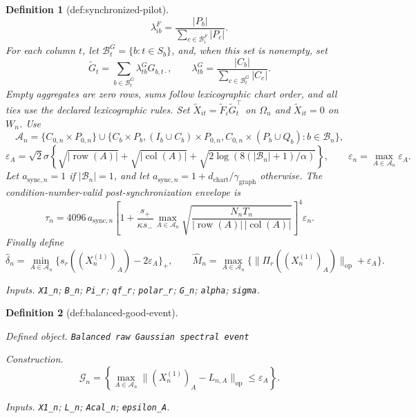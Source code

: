 \documentclass{article}
\newtheorem{definition}{Definition}
\begin{document}
\begin{definition}[def:synchronized-pilot]
\[\qquad
\lambda_{ib}^F=\frac{|P_b|}{\sum_{c\in\mathcal B_i^F}|P_c|}.
\]
For each column \(t\), let \(\mathcal B_t^G=\{b:t\in S_b\}\), and, when this set is nonempty, set
\[
\widetilde G_t=\sum_{b\in\mathcal B_t^G}\lambda_{tb}^GG_{b,t\cdot},
\qquad
\lambda_{tb}^G=\frac{|C_b|}{\sum_{c\in\mathcal B_t^G}|C_c|}.
\]
Empty aggregates are zero rows, sums follow lexicographic chart order, and all ties use the declared lexicographic rules. Set
\(\widetilde X_{it}=\widetilde F_i\widetilde G_t^{\top}\) on \(\Omega_n\) and
\(\widetilde X_{it}=0\) on \(W_n\).
Use
\[
\mathcal A_n=\{C_{0,n}\times P_{0,n}\}\cup
\{C_b\times P_b,(I_b\cup C_b)\times P_{0,n},
C_{0,n}\times(P_b\cup Q_b):b\in\mathcal B_n\},
\]
\[
\varepsilon_A=\sqrt{2}\sigma\left\{\sqrt{|\operatorname{row}(A)|}
+\sqrt{|\operatorname{col}(A)|}
+\sqrt{2\log(8(|\mathcal B_n|+1)/\alpha)}\right\},
\qquad
\varepsilon_n=\max_{A\in\mathcal A_n}\varepsilon_A.
\]
Let \(a_{\mathrm{sync},n}=1\) if \(|\mathcal B_n|=1\), and let
\(a_{\mathrm{sync},n}=1+d_{\mathrm{chart}}/\gamma_{\mathrm{graph}}\) otherwise. The condition-number-valid post-synchronization envelope is
\[
\tau_n=
4096\,a_{\mathrm{sync},n}
\left[
1+\frac{s_+}{\kappa s_-}
\max_{A\in\mathcal A_n}
\sqrt{\frac{N_nT_n}
{|\operatorname{row}(A)|\,|\operatorname{col}(A)|}}
\right]^4\varepsilon_n.
\]
Finally define
\[
\widehat\delta_n=\min_{A\in\mathcal A_n}
\{s_r((X_n^{(1)})_A)-2\varepsilon_A\}_+,
\qquad
\widehat M_n=\max_{A\in\mathcal A_n}
\{\|\Pi_r((X_n^{(1)})_A)\|_{\mathrm{op}}+\varepsilon_A\}.
\]
\par\smallskip\noindent\emph{Inputs.} \texttt{X1\_\allowbreak{}n}; \texttt{B\_\allowbreak{}n}; \texttt{Pi\_\allowbreak{}r}; \texttt{qf\_\allowbreak{}r}; \texttt{polar\_\allowbreak{}r}; \texttt{G\_\allowbreak{}n}; \texttt{alpha}; \texttt{sigma}.
\end{definition}

\begin{definition}[def:balanced-good-event]\label{def:balanced-good-event}
\par\smallskip\noindent\emph{Defined object.} \texttt{Balanced raw Gaussian spectral event}
\par\smallskip\noindent\emph{Construction.} \[\mathcal G_n=\left\{\max_{A\in\mathcal A_n}\lVert (X_n^{(1)})_A-L_{n,A}\rVert_{\mathrm{op}}\le\varepsilon_A\right\}.\]
\par\smallskip\noindent\emph{Inputs.} \texttt{X1\_\allowbreak{}n}; \texttt{L\_\allowbreak{}n}; \texttt{Acal\_\allowbreak{}n}; \texttt{epsilon\_\allowbreak{}A}.
\end{definition}
\end{document}
